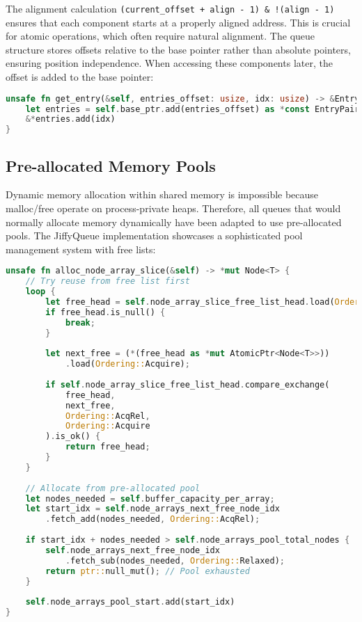 The alignment calculation \texttt{(current\_offset + align - 1) \& !(align - 1)} ensures that each component starts at a properly aligned address. This is crucial for atomic operations, which often require natural alignment. The queue structure stores offsets relative to the base pointer rather than absolute pointers, ensuring position independence. When accessing these components later, the offset is added to the base pointer:

\begin{lstlisting}[language=Rust, style=boxed, caption={Position-independent component access}, label={lst:position-independent}]
unsafe fn get_entry(&self, entries_offset: usize, idx: usize) -> &EntryPair {
    let entries = self.base_ptr.add(entries_offset) as *const EntryPair;
    &*entries.add(idx)
}
\end{lstlisting}

\subsection{Pre-allocated Memory Pools}

Dynamic memory allocation within shared memory is impossible because malloc/free operate on process-private heaps. Therefore, all queues that would normally allocate memory dynamically have been adapted to use pre-allocated pools. The JiffyQueue implementation showcases a sophisticated pool management system with free lists:

\begin{lstlisting}[language=Rust, style=boxed, caption={Lock-free memory pool allocation}, label={lst:pool-allocation}]
unsafe fn alloc_node_array_slice(&self) -> *mut Node<T> {
    // Try reuse from free list first
    loop {
        let free_head = self.node_array_slice_free_list_head.load(Ordering::Acquire);
        if free_head.is_null() {
            break;
        }
        
        let next_free = (*(free_head as *mut AtomicPtr<Node<T>>))
            .load(Ordering::Acquire);
            
        if self.node_array_slice_free_list_head.compare_exchange(
            free_head, 
            next_free, 
            Ordering::AcqRel, 
            Ordering::Acquire
        ).is_ok() {
            return free_head;
        }
    }
    
    // Allocate from pre-allocated pool
    let nodes_needed = self.buffer_capacity_per_array;
    let start_idx = self.node_arrays_next_free_node_idx
        .fetch_add(nodes_needed, Ordering::AcqRel);
        
    if start_idx + nodes_needed > self.node_arrays_pool_total_nodes {
        self.node_arrays_next_free_node_idx
            .fetch_sub(nodes_needed, Ordering::Relaxed);
        return ptr::null_mut(); // Pool exhausted
    }
    
    self.node_arrays_pool_start.add(start_idx)
}
\end{lstlisting}

